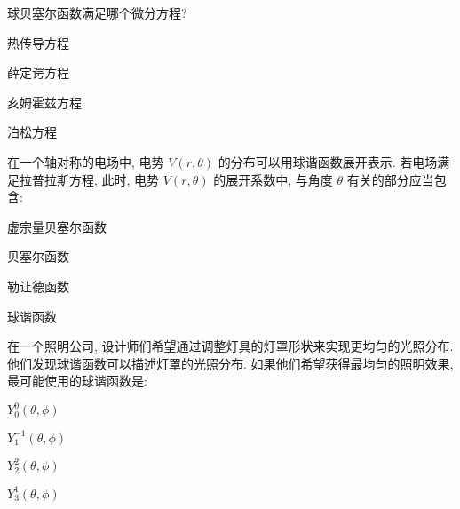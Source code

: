 \documentclass{njustexam}
\begin{document}
\begin{problem}
  球贝塞尔函数满足哪个微分方程? 

  \begin{abcd}
    \item 热传导方程
    \item 薛定谔方程
    \item 亥姆霍兹方程
    \item 泊松方程
  \end{abcd}
\end{problem}

\begin{problem}
  在一个轴对称的电场中, 电势 $V(r,  \theta)$ 的分布可以用球谐函数展开表示. 
  若电场满足拉普拉斯方程, 
  此时, 电势 $V(r,  \theta)$ 的展开系数中, 与角度 $\theta$ 有关的部分应当包含: 
  \begin{abcd}
  \item 虚宗量贝塞尔函数
  \item 贝塞尔函数 
  \item 勒让德函数
  \item 球谐函数 
  \end{abcd}
\end{problem}



\begin{problem}
  在一个照明公司, 设计师们希望通过调整灯具的灯罩形状来实现更均匀的光照分布. 他们发现球谐函数可以描述灯罩的光照分布. 如果他们希望获得最均匀的照明效果, 最可能使用的球谐函数是:
  \begin{abcd}
  \item $Y_{0}^0(\theta,  \phi)$
  
  \item $Y_{1}^{-1}(\theta,  \phi)$
  
  \item $Y_{2}^2(\theta,  \phi)$
  
  \item $Y_{3}^1(\theta,  \phi)$
  \end{abcd}
  \end{problem}
\end{document}
